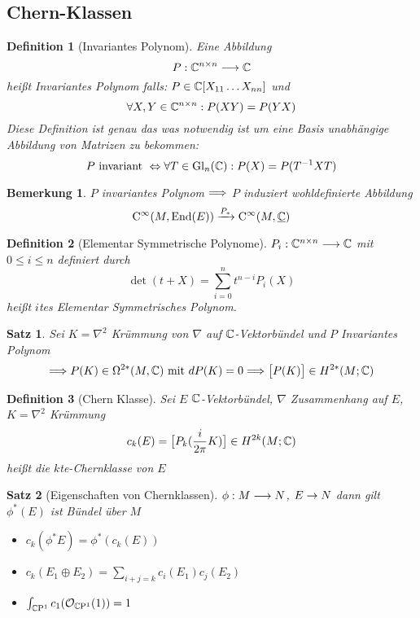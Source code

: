 \documentclass{report}
\newtheorem{Def}{Definition}[chapter]
\newtheorem{Thrm}{Satz}[chapter]
\newtheorem*{Bem}{Bemerkung}
\begin{document}
\subsection*{Chern-Klassen}

\begin{Def}[Invariantes Polynom]
    Eine Abbildung
    $$ P: \mathbb{C}^{n \times n} \longrightarrow \mathbb{C}$$ heißt Invariantes Polynom falls:
    $P \in \mathbb{C}[X_{11} \ldots X_{nn}]$ und 
    $$\forall X,Y \in \mathbb{C}^{n\times n}: P(XY) = P(YX)$$ 
    Diese Definition ist genau das was notwendig ist um eine Basis unabhängige Abbildung von Matrizen zu bekommen:
    $$ P \text{ invariant } \Leftrightarrow \forall T \in \operatorname{Gl}_n(\mathbb{C}): P(X) = P(T^{-1}XT)$$ 
\end{Def}

\begin{Bem}
    $P$ invariantes Polynom $\Longrightarrow$ $P$ induziert wohldefinierte Abbildung 
    $$\mathrm{C}^\infty(M,\operatorname{End}(E)) \xrightarrow{P_*} \mathrm{C}^\infty(M,\underline{\mathbb{C}})$$
\end{Bem}

\begin{Def}[Elementar Symmetrische Polynome]
    $ P_i: \mathbb{C}^{n \times n} \longrightarrow \mathbb{C}$ mit $0 \leq i \leq n$ definiert durch 
    $$\det(t+X) = \sum_{i=0}^{n} t^{n-i}P_i(X)$$
    heißt $i$tes Elementar Symmetrisches Polynom.
\end{Def}

\begin{Thrm}
   Sei $K = \nabla^2$ Krümmung von $\nabla$ auf $\mathbb{C}$-Vektorbündel und $P$ Invariantes Polynom
   $$\Longrightarrow P(K) \in \Omega^{2*}(M,\mathbb{C}) \text{ mit } dP(K) = 0 \Longrightarrow \big[P(K)\big] \in H^{2*}(M;\mathbb{C})$$
\end{Thrm}

\begin{Def}[Chern Klasse]
   Sei $E$ $\mathbb{C}$-Vektorbündel, $\nabla$ Zusammenhang auf $E$, $K = \nabla^2$ Krümmung
   $$c_k(E) = \big[P_k(\frac{i}{2\pi}K)\big] \in H^{2k}(M;\mathbb{C})$$ heißt die $k$te-Chernklasse von $E$ 
\end{Def}

\begin{Thrm}[Eigenschaften von Chernklassen]
    $\phi: M \longrightarrow N$, $E \rightarrow N$ dann gilt $\phi^*(E)$ ist Bündel über $M$
    \begin{itemize}
        \item $c_k(\phi^*E) = \phi^*(c_k(E))$
        \item $c_k(E_1 \oplus E_2) = \sum_{i+j=k}c_i(E_1)c_j(E_2)$
        \item $\int_{\mathbb{C}\mathrm{P}^{ 1 }}c_1(\mathcal{O}_{\mathbb{C}\mathrm{P}^{ 1 }}(1)) = 1$
    \end{itemize} 
\end{Thrm}
\end{document}
